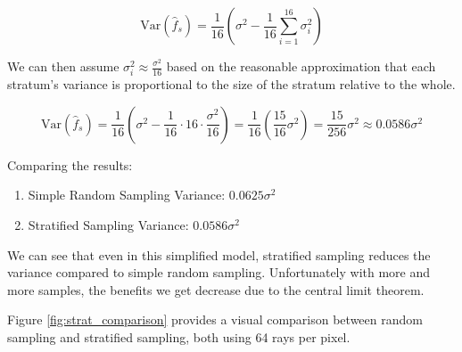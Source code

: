 \documentclass[12pt]{article}
\begin{document}
\[
    \text{Var}(\hat{f}_s) = \frac{1}{16} \left( \sigma^2 - \frac{1}{16} \sum_{i=1}^{16} \sigma_i^2 \right)
\]

We can then assume $\sigma_i^2 \approx \frac{\sigma^2}{16}$ based on the reasonable approximation that each stratum's variance is proportional to the size of the stratum relative to the whole.

\[
    \text{Var}(\hat{f}_s)
    = \frac{1}{16} \left( \sigma^2 - \frac{1}{16} \cdot 16 \cdot \frac{\sigma^2}{16} \right)
    = \frac{1}{16} \left( \frac{15}{16} \sigma^2 \right)
    = \frac{15}{256}\sigma^2 \approx 0.0586\sigma^2
\]

Comparing the results:
\begin{enumerate}
    \item[] Simple Random Sampling Variance: $0.0625\sigma^2$
    \item[] Stratified Sampling Variance: $0.0586\sigma^2$
\end{enumerate}

We can see that even in this simplified model, stratified sampling reduces the variance compared to simple random sampling. Unfortunately with more and more samples, the benefits we get decrease due to the central limit theorem.

Figure \ref{fig:strat_comparison} provides a visual comparison between random sampling and stratified sampling, both using 64 rays per pixel.
\end{document}
